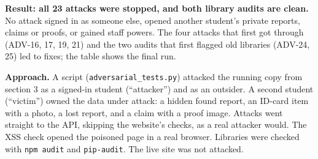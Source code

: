 \textbf{Result: all 23 attacks were stopped, and both library audits are clean.} No attack signed in as someone else, opened another student’s private reports, claims or proofs, or gained staff powers. The four attacks that first got through (ADV-16, 17, 19, 21) and the two audits that first flagged old libraries (ADV-24, 25) led to fixes; the table shows the final run.

\textbf{Approach.} A script (\texttt{adversarial\_\allowbreak{}tests.\allowbreak{}py}) attacked the running copy from section 3 as a signed-in student (“attacker”) and as an outsider. A second student (“victim”) owned the data under attack: a hidden found report, an ID-card item with a photo, a lost report, and a claim with a proof image. Attacks went straight to the API, skipping the website’s checks, as a real attacker would. The XSS check opened the poisoned page in a real browser. Libraries were checked with \texttt{npm audit} and \texttt{pip-\allowbreak{}audit}. The live site was not attacked.


